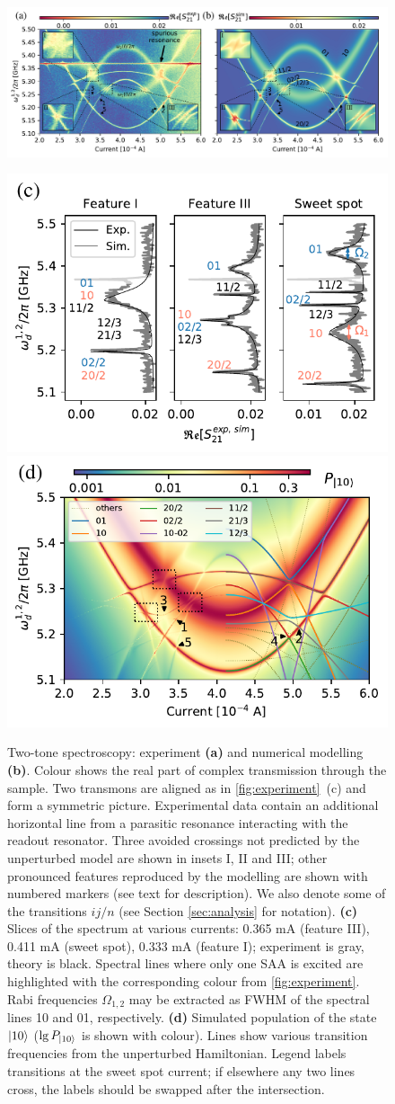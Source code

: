 \documentclass[%
 prx,
 amsmath,amssymb,
 reprint,%
]{revtex4-1}
\begin{document}
\begin{figure}
	
	\centering
	\includegraphics[width=\linewidth]{main_picture}
	
	\includegraphics[width=.495\linewidth]{main_picture_slices}
	\includegraphics[width=.495\linewidth]{stationary}
	\caption{Two-tone spectroscopy: experiment \textbf{(a)} and numerical modelling \textbf{(b)}. Colour shows the real part of complex transmission  through the sample. Two transmons are aligned as in \autoref{fig:experiment}~(c) and form a symmetric picture. Experimental data contain an additional horizontal line from a parasitic resonance interacting with the readout resonator. Three avoided crossings not predicted by the unperturbed model are shown in insets I, II and III; other pronounced features reproduced by the modelling are shown with numbered markers (see text for description). We also denote some of the transitions $ij/n$ (see Section \ref{sec:analysis} for notation). \textbf{(c)} Slices of the spectrum at various currents: 0.365 mA (feature III), 0.411 mA (sweet spot), 0.333 mA (feature I); experiment is gray, theory is black. Spectral lines where only one SAA is excited are highlighted with the corresponding colour from \autoref{fig:experiment}. Rabi frequencies $\Omega_{1,2}$ may be extracted as FWHM of the spectral lines 10 and 01, respectively. \textbf{(d)} Simulated population of the state $\ket{10}$ ($\lg P_{\ket{10}}$ is shown with colour). Lines show various transition frequencies from the unperturbed Hamiltonian. Legend labels transitions at the sweet spot current; if elsewhere any two lines cross, the labels should be swapped after the intersection.}
	\label{fig:two-tone}
\end{figure}
\end{document}
